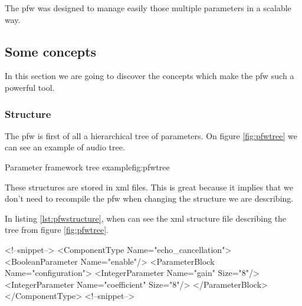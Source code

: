 The \gls{pfw} was designed to manage easily those multiple parameters in a scalable way.

\subsection{Some concepts}
In this section we are going to discover the concepts which make the
\gls{pfw} such a powerful tool.

\subsubsection{Structure}
The \gls{pfw} is first of all a hierarchical tree of parameters.
On figure \ref{fig:pfwtree} we can see an example of audio tree.

\begin{figureGraphics}{Parameter framework tree example}{fig:pfwtree}
\end{figureGraphics}

These structures are stored in \gls{xml} files. This is great because it implies that we don't need
to recompile the \gls{pfw} when changing the structure we are describing.

In listing \ref{lst:pfwstructure}, when can see the \gls{xml} structure file
describing the tree from figure \ref{fig:pfwtree}.

\begin{code}[language=pfwXml, caption=Structure file example snippet, label=lst:pfwstructure]
<!--snippet-->
<ComponentType Name="echo_cancellation">
    <BooleanParameter Name="enable"/>
    <ParameterBlock Name="configuration">
        <IntegerParameter Name="gain" Size="8"/>
        <IntegerParameter Name="coefficient" Size="8"/>
    </ParameterBlock>
</ComponentType>
<!--snippet-->
\end{code}

